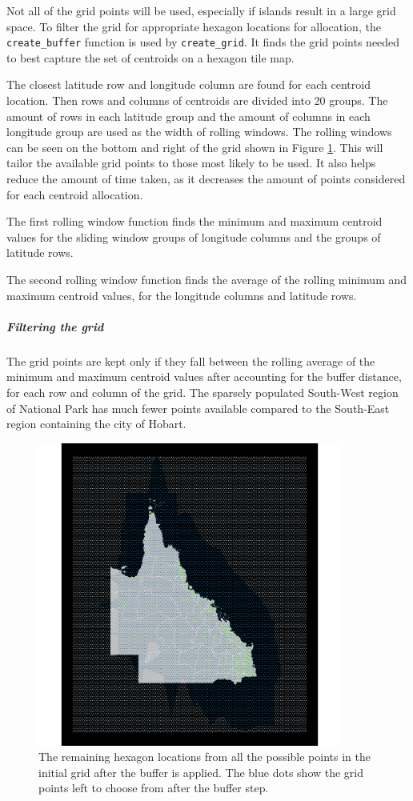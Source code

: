Not all of the grid points will be used, especially if islands result in
a large grid space. To filter the grid for appropriate hexagon locations
for allocation, the \texttt{create\_buffer} function is used by
\texttt{create\_grid}. It finds the grid points needed to best capture
the set of centroids on a hexagon tile map.

The closest latitude row and longitude column are found for each
centroid location. Then rows and columns of centroids are divided into
20 groups. The amount of rows in each latitude group and the amount of
columns in each longitude group are used as the width of rolling
windows. The rolling windows can be seen on the bottom and right of the
grid shown in Figure \ref{fig:filter-grid}. This will tailor the
available grid points to those most likely to be used. It also helps
reduce the amount of time taken, as it decreases the amount of points
considered for each centroid allocation.

The first rolling window function finds the minimum and maximum centroid
values for the sliding window groups of longitude columns and the groups
of latitude rows.

The second rolling window function finds the average of the rolling
minimum and maximum centroid values, for the longitude columns and
latitude rows.

\hypertarget{filtering-the-grid}{%
\subparagraph{Filtering the grid}\label{filtering-the-grid}}

The grid points are kept only if they fall between the rolling average
of the minimum and maximum centroid values after accounting for the
buffer distance, for each row and column of the grid. The sparsely
populated South-West region of National Park has much fewer points
available compared to the South-East region containing the city of
Hobart.

\begin{figure}[h]
\centering
\includegraphics[width=10cm]{figs/3grid.png}
\caption{\label{fig:filter-grid}The remaining hexagon locations from all the possible points in the initial grid after the buffer is applied. The blue dots show the grid points left to choose from after the buffer step.}
\end{figure}

